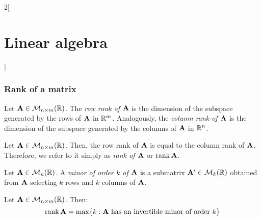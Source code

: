 \documentclass[../../../main.tex]{subfiles}
\begin{document}
\begin{multicols}{2}[\section{Linear algebra}]
  \subsubsection*{Rank of a matrix}
  \begin{definition}
    Let $\vb{A}\in\mathcal{M}_{n\times m}(\mathbb{R})$. The \textit{row rank of $\vb{A}$} is the dimension of the subspace generated by the rows of $\vb{A}$ in $\mathbb{R}^m$. Analogously, the \textit{column rank of $\vb{A}$} is the dimension of the subspace generated by the columns of $\vb{A}$ in $\mathbb{R}^n$.
  \end{definition}
  \begin{prop}
    Let $\vb{A}\in\mathcal{M}_{n\times m}(\mathbb{R})$. Then, the row rank of $\vb{A}$ is equal to the column rank of $\vb{A}$. Therefore, we refer to it simply as \textit{rank of $\vb{A}$} or $\rank\vb{A}$.
  \end{prop}
  \begin{definition}
    Let $\vb{A}\in\mathcal{M}_n(\mathbb{R})$. A \textit{minor of order $k$ of $\vb{A}$} is a submatrix $\vb{A}'\in\mathcal{M}_k(\mathbb{R})$ obtained from $\vb{A}$ selecting $k$ rows and $k$ columns of $\vb{A}$.
  \end{definition}
  \begin{prop}
    Let $\vb{A}\in\mathcal{M}_{n\times m}(\mathbb{R})$. Then:
    $$\rank\mathblack{A}=\max\{k:\text{$\mathblack{A}$\ has an invertible minor of order $k$}\}$$
  \end{prop}

\end{multicols}
\end{document}

